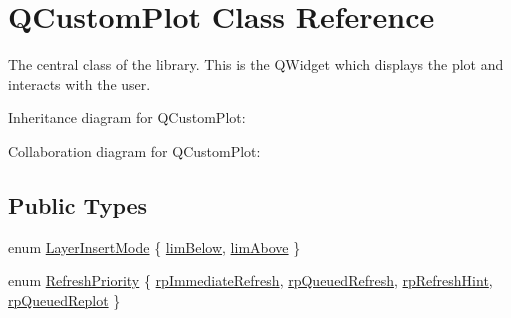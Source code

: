 \hypertarget{classQCustomPlot}{}\section{Q\+Custom\+Plot Class Reference}
\label{classQCustomPlot}


The central class of the library. This is the Q\+Widget which displays the plot and interacts with the user.  




Inheritance diagram for Q\+Custom\+Plot\+:


Collaboration diagram for Q\+Custom\+Plot\+:
\subsection*{Public Types}
\begin{DoxyCompactItemize}
\item 
enum \hyperlink{classQCustomPlot_a75a8afbe6ef333b1f3d47abb25b9add7}{Layer\+Insert\+Mode} \{ \hyperlink{classQCustomPlot_a75a8afbe6ef333b1f3d47abb25b9add7aee39cf650cd24e68552da0b697ce4a93}{lim\+Below}, 
\hyperlink{classQCustomPlot_a75a8afbe6ef333b1f3d47abb25b9add7a062b0b7825650b432a713c0df6742d41}{lim\+Above}
 \}
\item 
enum \hyperlink{classQCustomPlot_a45d61392d13042e712a956d27762aa39}{Refresh\+Priority} \{ \hyperlink{classQCustomPlot_a45d61392d13042e712a956d27762aa39aa6eda645ccf1a60635df3e8b71ea6ae2}{rp\+Immediate\+Refresh}, 
\hyperlink{classQCustomPlot_a45d61392d13042e712a956d27762aa39acd6f1e590ea775d1ddee666428077f3e}{rp\+Queued\+Refresh}, 
\hyperlink{classQCustomPlot_a45d61392d13042e712a956d27762aa39a49666a5854a68dbcca8b277b03331260}{rp\+Refresh\+Hint}, 
\hyperlink{classQCustomPlot_a45d61392d13042e712a956d27762aa39a019650c6ddf308f97e811fbfff207a8f}{rp\+Queued\+Replot}
 \}
\end{DoxyCompactItemize}
